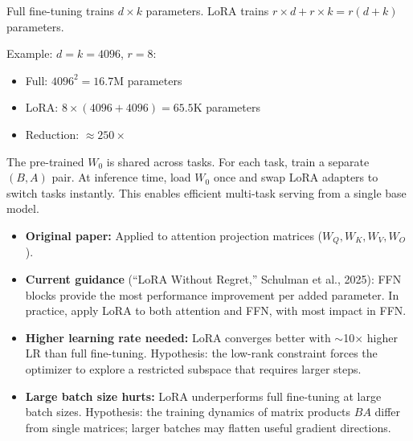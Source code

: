 \documentclass[11pt, a4paper]{article}
\begin{document}
\begin{mathbox}
Full fine-tuning trains $d \times k$ parameters. LoRA trains $r \times d + r \times k = r(d + k)$ parameters.

Example: $d = k = 4096$, $r = 8$:
\begin{itemize}[leftmargin=1.5em]
  \item Full: $4096^2 = 16.7$M parameters
  \item LoRA: $8 \times (4096 + 4096) = 65.5$K parameters
  \item Reduction: $\approx 250\times$
\end{itemize}
\end{mathbox}

\begin{notebox}
The pre-trained $W_0$ is shared across tasks. For each task, train a separate $(B, A)$ pair. At inference time, load $W_0$ once and swap LoRA adapters to switch tasks instantly. This enables efficient multi-task serving from a single base model.
\end{notebox}

\begin{notebox}
\begin{itemize}[leftmargin=1.5em]
  \item \textbf{Original paper:} Applied to attention projection matrices ($W_Q, W_K, W_V, W_O$).
  \item \textbf{Current guidance} (``LoRA Without Regret,'' Schulman et al., 2025): FFN blocks provide the most performance improvement per added parameter. In practice, apply LoRA to both attention and FFN, with most impact in FFN.
\end{itemize}
\end{notebox}

\begin{warnbox}
\begin{itemize}[leftmargin=1.5em]
  \item \textbf{Higher learning rate needed:} LoRA converges better with $\sim$10$\times$ higher LR than full fine-tuning. Hypothesis: the low-rank constraint forces the optimizer to explore a restricted subspace that requires larger steps.
  \item \textbf{Large batch size hurts:} LoRA underperforms full fine-tuning at large batch sizes. Hypothesis: the training dynamics of matrix products $BA$ differ from single matrices; larger batches may flatten useful gradient directions.
\end{itemize}
\end{warnbox}
\end{document}
